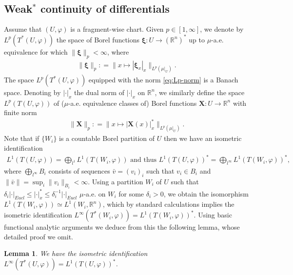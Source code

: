 \documentclass{amsart}
\newtheorem{lemma}[theorem]{Lemma}
\numberwithin{equation}{section}
\newcommand{\R}{\mathbb{R}}
\newcommand{\inv}{^{-1}}
\newcommand{\defl}{\mathrel{\mathop:}=}
\begin{document}
\subsection{Weak$^*$ continuity of differentials}
Assume that $(U,\varphi)$ is a fragment-wise chart. Given $p\in [1,\infty]$, we denote by $L^p(T^*(U,\varphi))$ the space of Borel functions $\bm\xi:U\to (\R^n)^*$ up to $\mu$-a.e. equivalence for which $\|\bm\xi\|_p<\infty$, where
\begin{align}\label{eq:Lp-norm}
	\|\bm\xi\|_{p}\defl \|x\mapsto |\bm\xi_x|_x\|_{L^p(\mu|_U)}.
\end{align}
The space $L^p(T^*(U,\varphi))$ equipped with the norm \eqref{eq:Lp-norm} is a Banach space. Denoting by $|\cdot|_x^*$ the dual norm of $|\cdot|_x$ on $\R^n$, we similarly define the space $L^p(T(U,\varphi))$ of ($\mu$-a.e. equivalence classes of) Borel functions $\bm X:U\to \R^n$ with finite norm
\begin{align}
	\|\bm X\|_{p}\defl \|x\mapsto |\bm X(x)|^*_x\|_{L^p(\mu|_U)}.
\end{align}
Note that if $\{W_i\}$ is a countable Borel partition of $U$ then we have an isometric identification 
\begin{align*}
L^1(T(U,\varphi))= \bigoplus_{l^1}L^1(T(W_i,\varphi))\textrm{ and thus }L^1(T(U,\varphi))^*=\bigoplus_{l^\infty}L^1(T(W_i,\varphi))^*,
\end{align*}
where $\bigoplus_{l^\infty}B_i$ consists of sequences $\bar v= (v_i)_i$ such that $v_i\in B_i$ and $\|\bar v\|=\sup_i\|v_i\|_{B_i}<\infty$. Using a partition $W_i$ of $U$ such that $\delta_i|\cdot|_{Eucl}\le |\cdot|_x^*\le \delta_i\inv|\cdot|_{Eucl}$ $\mu$-a.e. on $W_i$ for some $\delta_i>0$, we obtain the isomorphism $L^1(T(W_i,\varphi))\simeq L^1(W_i,\R^n)$, which by standard calculations implies the isometric identification $L^\infty(T^*(W_i,\varphi))=L^1(T(W_i,\varphi))^*$. Using basic functional analytic arguments we deduce from this the following lemma, whose detailed proof we omit.

\begin{lemma}\label{lem:L1-Linfty-duality}
We have the isometric identification $L^\infty(T^*(U,\varphi))=L^1(T(U,\varphi))^*$.
\end{lemma}
\end{document}
